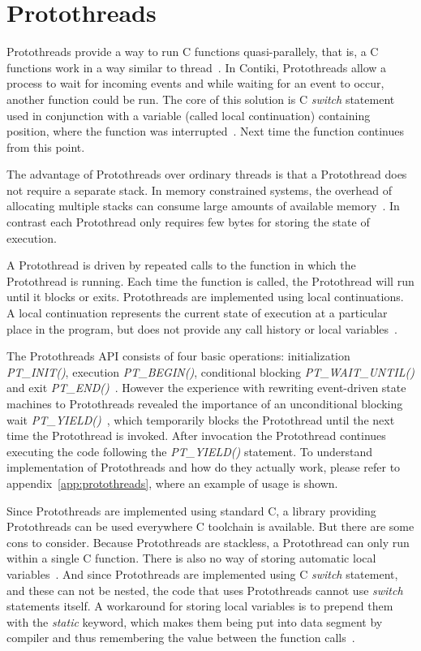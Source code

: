
\section{Protothreads}\label{sec:contiki-protothreads}
Protothreads provide a way to run C functions quasi-parallely,
that is, a C functions work in a way similar to thread~\cite{paper-protothreads}.
In Contiki, Protothreads allow a process to wait for incoming events and
while waiting for an event to occur, another function could be run.
The core of this solution is C {\it switch} statement used in conjunction with a variable (called local continuation)
containing position, where the function was interrupted~\cite{paper-protothreads}.
Next time the function continues from this point.

The advantage of Protothreads over ordinary threads is that a Protothread does not require a separate stack.
In memory constrained systems, the overhead of allocating multiple stacks can consume large amounts of
available memory~\cite{paper-protothreads}.
In contrast each Protothread only requires few bytes for storing the state of execution.

A Protothread is driven by repeated calls to the function in which the Protothread is running.
Each time the function is called, the Protothread will run until it blocks or exits.
Protothreads are implemented using local continuations. A local continuation represents the current state
of execution at a particular place in the program, but does not provide any call history or local variables~\cite{contiki-docs}.

The Protothreads API consists of four basic operations: initialization {\it{PT\_INIT()}}, execution {\it{PT\_BEGIN()}},
conditional blocking {\it{PT\_WAIT\_UNTIL()}} and exit {\it{PT\_END()}}~\cite{paper-protothreads}.
However the experience with rewriting event-driven state machines to Protothreads revealed
the importance of an unconditional blocking wait {\it{PT\_YIELD()}}~\cite{thesis-programming},
which temporarily blocks the Protothread until the next time the Protothread is invoked.
After invocation the Protothread continues executing the code following the {\it{PT\_YIELD()}} statement.
To understand implementation of Protothreads and how do they actually work,
please refer to appendix~\ref{app:protothreads}, where an example of usage is shown.

Since Protothreads are implemented using standard C, a library providing Protothreads can be used everywhere C toolchain is available.
But there are some cons to consider. Because Protothreads are stackless, a Protothread can only run within a single C function.
There is also no way of storing automatic local variables~\cite{contiki-docs}.
And since Protothreads are implemented using C {\it switch} statement, and these can
not be nested, the code that uses Protothreads cannot use {\it switch} statements itself.
A workaround for storing local variables is to prepend them with the {\it static} keyword, which makes them being put into data segment
by compiler and thus remembering the value between the function calls~\cite{paper-protothreads}.
